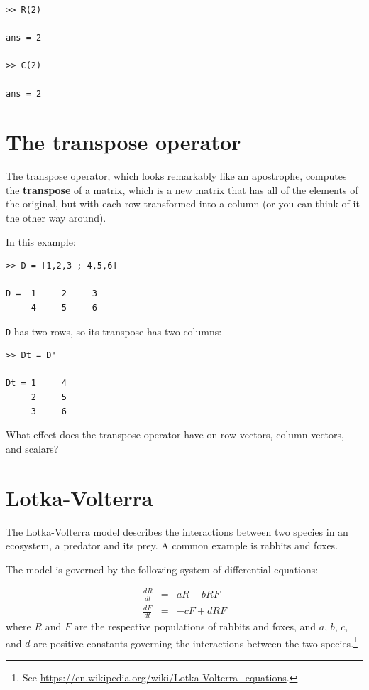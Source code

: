 \documentclass[
]{book}
\begin{document}
\begin{verbatim}
>> R(2)

ans = 2

>> C(2)

ans = 2
\end{verbatim}



\section{The transpose operator}

The transpose operator, which looks remarkably like an apostrophe,
computes the {\bf transpose} of a matrix, which is a new matrix
that has all of the elements of the original, but with each row
transformed into a column (or you can think of it the other way around).

In this example:

\begin{verbatim}
>> D = [1,2,3 ; 4,5,6]

D =  1     2     3
     4     5     6
\end{verbatim}

{\tt D} has two rows, so its transpose has two columns:

\begin{verbatim}
>> Dt = D'

Dt = 1     4
     2     5
     3     6
\end{verbatim}

\begin{ex}
What effect does the transpose operator
have on row vectors, column vectors, and scalars?
\end{ex}


\section{Lotka-Volterra}
\label{sect:lotka}

The Lotka-Volterra model describes the interactions between two
species in an ecosystem, a predator and its prey.  A common example
is rabbits and foxes.

The model is governed by the following system of differential equations:

\begin{eqnarray}
    \frac{dR}{dt} &=& a R - b R F
    \\
    \frac{dF}{dt} &=& - c F + d R F
\end{eqnarray}
%
where $R$ and $F$ are the respective populations of rabbits and foxes,
and $a$, $b$, $c$, and $d$ are positive constants
governing the interactions between the two species.\footnote{See
\url{https://en.wikipedia.org/wiki/Lotka-Volterra_equations}.}
\end{document}
